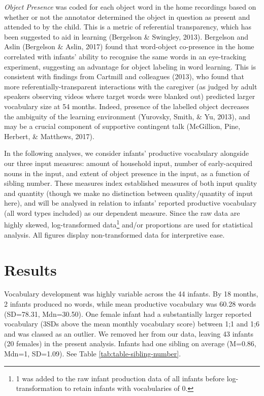 \documentclass[
  english,
  man,floatsintext]{apa6}
\begin{document}
\emph{Object Presence} was coded for each object word in the home recordings based on whether or not the annotator determined the object in question as present and attended to by the child. This is a metric of referential transparency, which has been suggested to aid in learning (Bergelson \& Swingley, 2013). Bergelson and Aslin (Bergelson \& Aslin, 2017) found that word-object co-presence in the home correlated with infants' ability to recognise the same words in an eye-tracking experiment, suggesting an advantage for object labeling in word learning. This is consistent with findings from Cartmill and colleagues (2013), who found that more referentially-transparent interactions with the caregiver (as judged by adult speakers observing videos where target words were blanked out) predicted larger vocabulary size at 54 months. Indeed, presence of the labelled object decreases the ambiguity of the learning environment (Yurovsky, Smith, \& Yu, 2013), and may be a crucial component of supportive contingent talk (McGillion, Pine, Herbert, \& Matthews, 2017).

In the following analyses, we consider infants' productive vocabulary alongside our three input measures: amount of household input, number of early-acquired nouns in the input, and extent of object presence in the input, as a function of sibling number. These measures index established measures of both input quality and quantity (though we make no distinction between quality/quantity of input here), and will be analysed in relation to infants' reported productive vocabulary (all word types included) as our dependent measure. Since the raw data are highly skewed, log-transformed data\footnote{1 was added to the raw infant production data of all infants before log-transformation to retain infants with vocabularies of 0.} and/or proportions are used for statistical analysis. All figures display non-transformed data for interpretive ease.

\hypertarget{results}{%
\section{Results}\label{results}}

Vocabulary development was highly variable across the 44 infants. By 18 months, 2 infants produced no words, while mean productive vocabulary was 60.28 words (SD=78.31, Mdn=30.50). One female infant had a substantially larger reported vocabulary (3SDs above the mean monthly vocabulary score) between 1;1 and 1;6 and was classed as an outlier. We removed her from our data, leaving 43 infants (20 females) in the present analysis. Infants had one sibling on average (M=0.86, Mdn=1, SD=1.09). See Table \ref{tab:table-sibling-number}.
\end{document}

